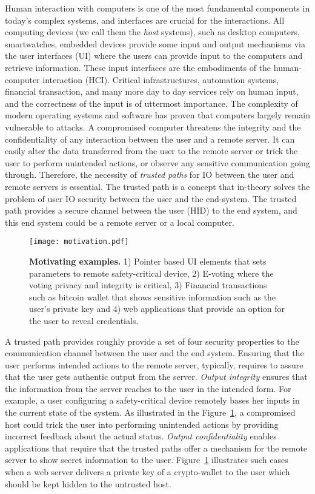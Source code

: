 Human interaction with computers is one of the most fundamental components in today's complex systems, and interfaces are crucial for the interactions. All computing devices (we call them the \emph{host} systems), such as desktop computers, smartwatches, embedded devices provide some input and output mechanisms via the user interfaces (UI) where the users can provide input to the computers and retrieve information. These input interfaces are the embodiments of the human-computer interaction (HCI). Critical infrastructures, automation systems, financial transaction, and many more day to day services rely on human input, and the correctness of the input is of uttermost importance. The complexity of modern operating systems and software has proven that computers largely remain vulnerable to attacks. A compromised computer threatens the integrity and the confidentiality of any interaction between the user and a remote server. It can easily alter the data transferred from the user to the remote server or trick the user to perform unintended actions, or observe any sensitive communication going through. Therefore, the necessity of \emph{trusted paths} for IO between the user and remote servers is essential. The trusted path is a concept that in-theory solves the problem of user IO security between the user and the end-system. The trusted path provides a secure channel between the user (HID) to the end system, and this end system could be a remote server or a local computer. 

\begin{figure}[t]
\centering
\texttt{[image: motivation.pdf]}
\caption{\textbf{Motivating examples.} 1) Pointer based UI elements that sets parameters to remote safety-critical device, 2) E-voting where the voting privacy and integrity is critical, 3) Financial transactions such as bitcoin wallet that shows sensitive information such as the user's private key and 4) web applications that provide an option for the user to reveal credentials.}
\spacesave
\label{fig:motivation}
\centering
\end{figure}

A trusted path provides roughly provide a set of four security properties to the communication channel between the user and the end system. Ensuring that the user performs intended actions to the remote server, typically, requires to assure that the user gets authentic output from the server. \emph{Output integrity} ensures that the information from the server reaches to the user in the intended form. For example, a user configuring a safety-critical device remotely bases her inputs in the current state of the system. As illustrated in the Figure~\ref{fig:motivation}, a compromised host could trick the user into performing unintended actions by providing incorrect feedback about the actual status. \emph{Output confidentiality} enables applications that require that the trusted paths offer a mechanism for the remote server to show secret information to the user. Figure~\ref{fig:motivation} illustrates such cases when a web server delivers a private key of a crypto-wallet to the user which should be kept hidden to the untrusted host.

